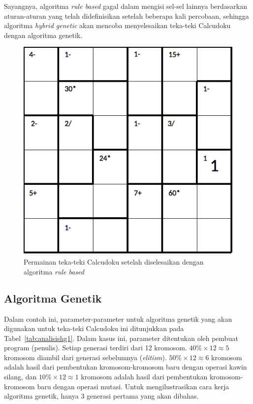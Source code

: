 Sayangnya, algoritma \textit{rule based} gagal dalam mengisi sel-sel lainnya berdasarkan aturan-aturan yang telah didefinisikan setelah beberapa kali percobaan, sehingga algoritma \textit{hybrid genetic} akan mencoba menyelesaikan teka-teki Calcudoku dengan algoritma genetik.

\begin{figure}
\centering
\captionsetup{justification=centering}
\includegraphics[scale=0.333]{Gambar/hybridgenetic/PuzzleAfterRuleBased}
\caption[Permainan teka-teki Calcudoku setelah diselesaikan dengan algoritma \textit{rule based}]{Permainan teka-teki Calcudoku setelah diselesaikan dengan algoritma \textit{rule based}}
\label{fig:analisishg2}
\end{figure}

\subsection{Algoritma Genetik}
\label{sec:analisisgenetik}

Dalam contoh ini, parameter-parameter untuk algoritma genetik yang akan digunakan untuk teka-teki Calcudoku ini ditunjukkan pada Tabel~\ref{tab:analisishg1}. Dalam kasus ini, parameter ditentukan oleh pembuat program (penulis). Setiap generasi terdiri dari 12 kromosom. \begin{math}40\% \times 12 \approx 5\end{math} kromosom diambil dari generasi sebelumnya (\textit{elitism}). \begin{math}50\% \times 12 \approx 6\end{math} kromosom adalah hasil dari pembentukan kromosom-kromosom baru dengan operasi kawin silang, dan \begin{math}10\% \times 12 \approx 1\end{math} kromosom adalah hasil dari pembentukan kromosom-kromosom baru dengan operasi mutasi. Untuk mengilustrasikan cara kerja algoritma genetik, hanya 3 generasi pertama yang akan dibahas.

